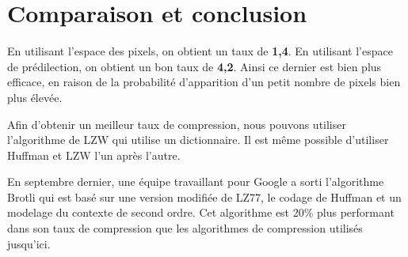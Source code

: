 \documentclass[a4paper,11pt]{article}
\begin{document}
\section{Comparaison et conclusion}

En utilisant l'espace des pixels, on obtient un taux de \textbf{1,4}. En utilisant l'espace de prédilection, on obtient un bon taux de \textbf{4,2}. Ainsi ce dernier est bien plus efficace, en raison de la probabilité d'apparition d'un petit nombre de pixels bien plus élevée.

Afin d'obtenir un meilleur taux de compression, nous pouvons utiliser l'algorithme de LZW qui utilise un dictionnaire. Il est même possible d'utiliser Huffman et LZW l'un après l'autre.

En septembre dernier, une équipe travaillant pour Google a sorti l'algorithme Brotli qui est basé sur une version modifiée de LZ77, le codage de Huffman et un modelage du contexte de second ordre. Cet algorithme est 20\% plus performant dans son taux de compression que les algorithmes de compression utilisés jusqu'ici.
\end{document}

